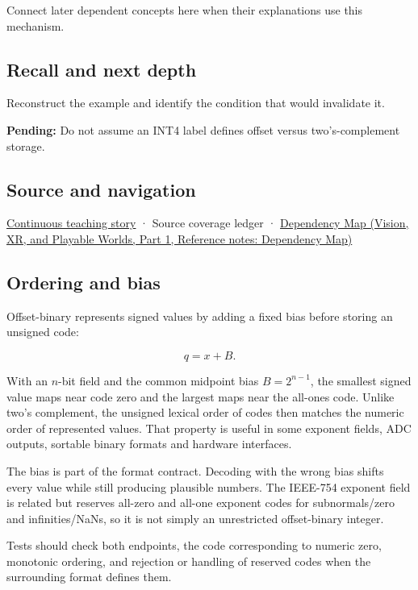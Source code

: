 Connect later dependent concepts here when their explanations use this mechanism.

\subsection{Recall and next depth}\label{appendix-53a8cfb25f8d-recall-and-next-depth}

\hypertarget{appendix-53a8cfb25f8d-recall-and-next-depth}{}

Reconstruct the example and identify the condition that would invalidate it.

\textbf{Pending:} Do not assume an INT4 label defines offset versus two's-complement storage.

\subsection{Source and navigation}\label{appendix-53a8cfb25f8d-source-and-navigation}

\hypertarget{appendix-53a8cfb25f8d-source-and-navigation}{}

\hyperref[01-foundations-i-ch001-choosing-what-information-to-keep]{Continuous teaching story} · {Source coverage ledger} · \href{../07-Vision-XR-and-Playable-Worlds-P01/main.pdf\#nameddest=appendix-4ad47bdd269a}{Dependency Map (Vision, XR, and Playable Worlds, Part 1, Reference notes: Dependency Map)}

\subsection{Ordering and bias}\label{appendix-53a8cfb25f8d-ordering-and-bias}

\hypertarget{appendix-53a8cfb25f8d-ordering-and-bias}{}

Offset-binary represents signed values by adding a fixed bias before storing an unsigned code:

\[q=x+B.\]

With an \(n\)-bit field and the common midpoint bias \(B=2^{n-1}\), the smallest signed value maps near code zero and the largest maps near the all-ones code. Unlike two's complement, the unsigned lexical order of codes then matches the numeric order of represented values. That property is useful in some exponent fields, ADC outputs, sortable binary formats and hardware interfaces.

The bias is part of the format contract. Decoding with the wrong bias shifts every value while still producing plausible numbers. The IEEE-754 exponent field is related but reserves all-zero and all-one exponent codes for subnormals/zero and infinities/NaNs, so it is not simply an unrestricted offset-binary integer.

Tests should check both endpoints, the code corresponding to numeric zero, monotonic ordering, and rejection or handling of reserved codes when the surrounding format defines them.

